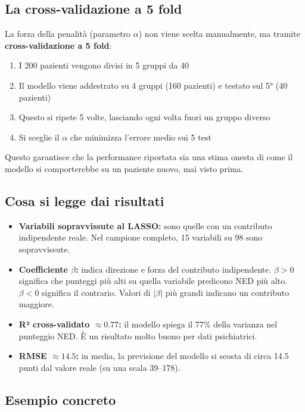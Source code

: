 \documentclass[12pt, a4paper]{article}
\begin{document}
\subsection{La cross-validazione a 5 fold}

La forza della penalità (parametro $\alpha$) non viene scelta manualmente, ma tramite
\textbf{cross-validazione a 5 fold}:

\begin{enumerate}
    \item I 200 pazienti vengono divisi in 5 gruppi da 40
    \item Il modello viene addestrato su 4 gruppi (160 pazienti) e testato sul 5° (40 pazienti)
    \item Questo si ripete 5 volte, lasciando ogni volta fuori un gruppo diverso
    \item Si sceglie il $\alpha$ che minimizza l'errore medio sui 5 test
\end{enumerate}

Questo garantisce che la performance riportata sia una stima onesta di come il modello si
comporterebbe su un paziente nuovo, mai visto prima.

\subsection{Cosa si legge dai risultati}

\begin{itemize}
    \item \textbf{Variabili sopravvissute al LASSO:} sono quelle con un contributo
          indipendente reale. Nel campione completo, 15 variabili su 98 sono sopravvissute.
    \item \textbf{Coefficiente $\beta$:} indica direzione e forza del contributo indipendente.
          $\beta > 0$ significa che punteggi più alti su quella variabile predicono NED più
          alto. $\beta < 0$ significa il contrario. Valori di $|\beta|$ più grandi indicano
          un contributo maggiore.
    \item \textbf{R² cross-validato $\approx 0.77$:} il modello spiega il 77\% della varianza
          nel punteggio NED. È un risultato molto buono per dati psichiatrici.
    \item \textbf{RMSE $\approx 14.5$:} in media, la previsione del modello si scosta di
          circa 14.5 punti dal valore reale (su una scala 39--178).
\end{itemize}

\subsection{Esempio concreto}
\end{document}

